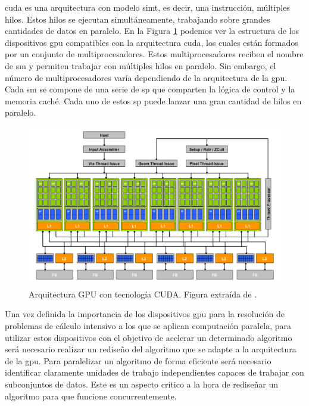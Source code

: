 \gls{cuda} es una arquitectura con modelo \gls{simt}, es decir, una instrucción, múltiples hilos.
Estos hilos se ejecutan simultáneamente, trabajando sobre grandes cantidades de datos en paralelo.
En la Figura \ref{fig:arquitectura-gpu-cuda} \citep{peter2009nvidia} podemos ver la estructura de los dispositivos \gls{gpu} compatibles con la arquitectura \gls{cuda}, los cuales están formados por un conjunto de multiprocesadores.
Estos multiprocesadores reciben el nombre de \gls{sm} y permiten trabajar con múltiples hilos en paralelo.
Sin embargo, el número de multiprocesadores varía dependiendo de la arquitectura de la \gls{gpu}. Cada \gls{sm} se compone de una serie de \gls{sp} que comparten la lógica de control y la memoria caché.
Cada uno de estos \gls{sp} puede lanzar una gran cantidad de hilos en paralelo.

\begin{figure}[h]
    \centering
    \includegraphics[width=\linewidth]{archivos/diagrama-arquitectura-cuda.png}
    \caption{Arquitectura GPU con tecnología CUDA. Figura extraída de \cite{peter2009nvidia}.}
    \label{fig:arquitectura-gpu-cuda}
\end{figure}

Una vez definida la importancia de los dispositivos \gls{gpu} para la resolución de problemas de cálculo intensivo a los que se aplican computación paralela, para utilizar estos dispositivos con el objetivo de acelerar un determinado algoritmo será necesario realizar un rediseño del algoritmo que se adapte a la arquitectura de la \gls{gpu}.
Para paralelizar un algoritmo de forma eficiente será necesario identificar claramente unidades de trabajo independientes capaces de trabajar con subconjuntos de datos.
Este es un aspecto crítico a la hora de rediseñar un algoritmo para que funcione concurrentemente.

